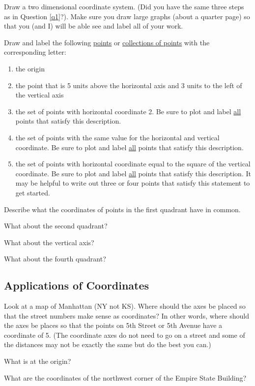 \bq Draw a two dimensional coordinate system. (Did you have the same three steps as in Question \ref{q1}?). Make sure you draw large graphs (about a quarter page) so that you (and I) will be able see and label all of your work.

Draw and label the following \underline{points} or \underline{collections of points} with the corresponding letter:
\begin{enumerate}
\item the origin
\item the point that is 5 units above the horizontal axis and 3 units to the left of the vertical axis
\item the set of points with horizontal coordinate 2. Be sure to plot and label \underline{all} points that satisfy this description.
\item the set of points with the same value for the horizontal and vertical coordinate. Be sure to plot and label \underline{all} points that satisfy this description.
\item the set of points with horizontal coordinate equal to the square of the vertical coordinate. Be sure to plot and label \underline{all} points that satisfy this description. It may be helpful to write out three or four points that satisfy this statement to get started.
\end{enumerate}
\eq

\bq \be
\item Describe what the coordinates of points in the first quadrant have in common.
\item What about the second quadrant?
\item What about the vertical axis?
\item What about the fourth quadrant?
\ee \eq

\subsection{Applications of Coordinates}

\begin{annotation}
\end{annotation}

\bq \be
\item Look at a map of Manhattan (NY not KS). Where should the axes be placed so that the street numbers make sense as coordinates? In other words, where should the axes be places so that the points on 5th Street or 5th Avenue have a coordinate of 5. (The coordinate axes do not need to go on a street and some of the distances may not be exactly the same but do the best you can.)
\item What is at the origin?
\item What are the coordinates of the northwest corner of the Empire State Building?
\ee \eq

